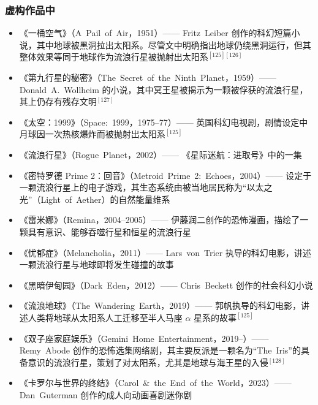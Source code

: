 \subsubsection{虚构作品中}
\begin{itemize}
\item 《一桶空气》（A~Pail~of~Air，1951）—— Fritz~Leiber 创作的科幻短篇小说，其中地球被黑洞拉出太阳系。尽管文中明确指出地球仍绕黑洞运行，但其整体效果等同于地球作为流浪行星被抛射出太阳系$^{[125][126]}$  
\item 《第九行星的秘密》（The~Secret~of~the~Ninth~Planet，1959）—— Donald~A.~Wollheim 的小说，其中冥王星被揭示为一颗被俘获的流浪行星，其上仍存有残存文明$^{[127]}$  
\item 《太空：1999》（Space:~1999，1975--77）—— 英国科幻电视剧，剧情设定中月球因一次热核爆炸而被抛射出太阳系$^{[125]}$  
\item 《流浪行星》（Rogue~Planet，2002）—— 《星际迷航：进取号》中的一集  
\item 《密特罗德 Prime 2：回音》（Metroid~Prime~2:~Echoes，2004）—— 设定于一颗流浪行星上的电子游戏，其生态系统由被当地居民称为“以太之光”（Light~of~Aether）的自然能量维系  
\item 《雷米娜》（Remina，2004--2005）—— 伊藤润二创作的恐怖漫画，描绘了一颗具有意识、能够吞噬行星和恒星的流浪行星  
\item 《忧郁症》（Melancholia，2011）—— Lars~von~Trier 执导的科幻电影，讲述一颗流浪行星与地球即将发生碰撞的故事  
\item 《黑暗伊甸园》（Dark~Eden，2012）—— Chris~Beckett 创作的社会科幻小说  
\item 《流浪地球》（The~Wandering~Earth，2019）—— 郭帆执导的科幻电影，讲述人类将地球从太阳系人工迁移至半人马座 $\alpha$ 星系的故事$^{[125]}$  
\item 《双子座家庭娱乐》（Gemini~Home~Entertainment，2019--）—— Remy~Abode 创作的恐怖选集网络剧，其主要反派是一颗名为“The~Iris”的具备意识的流浪行星，策划了对太阳系，尤其是地球与海王星的入侵$^{[128]}$  
\item 《卡罗尔与世界的终结》（Carol~\&~the~End~of~the~World，2023）—— Dan~Guterman 创作的成人向动画喜剧迷你剧
\end{itemize}
